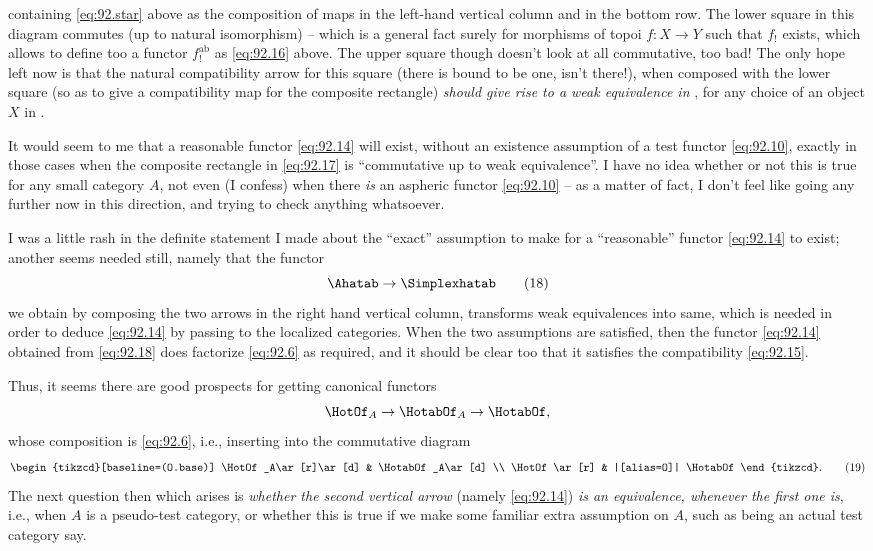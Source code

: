 containing \eqref{eq:92.star} above as the composition of maps in the
left-hand vertical column and in the bottom row. The lower square in
this diagram commutes (up to natural isomorphism) -- which is a
general fact surely for morphisms of topoi $f:X\to Y$ such that $f_!$
exists, which allows to define too a functor $f_!^{\mathrm{ab}}$ as
\eqref{eq:92.16} above. The upper square though doesn't look at all
commutative, too bad! The only hope left now is that the natural
compatibility arrow for this square (there is bound to be one, isn't
there!), when composed with the lower square (so as to give a
compatibility map for the composite rectangle) \emph{should give rise
  to a weak equivalence in} \Simplexhatab, for any choice of an object
$X$ in \Ahat.

It would seem to me that a reasonable functor \eqref{eq:92.14} will
exist, without an existence assumption of a test functor
\eqref{eq:92.10}, exactly in those cases when the composite rectangle
in \eqref{eq:92.17} is ``commutative up to weak equivalence''. I have
no idea whether or not this is true for any small category $A$, not
even (I confess) when there \emph{is} an aspheric functor
\eqref{eq:92.10} -- as a matter of fact, I don't feel like going any
further now in this direction, and trying to check anything
whatsoever.

I was a little rash in the definite statement I made about the
``exact'' assumption to make for a ``reasonable'' functor
\eqref{eq:92.14} to exist; another seems needed still, namely that the
functor
\begin{equation}
  \label{eq:92.18}
  \Ahatab\to\Simplexhatab\tag{18}
\end{equation}
we obtain by composing the two arrows in the right hand vertical
column, transforms weak equivalences into same, which is needed in
order to deduce \eqref{eq:92.14} by passing to the localized
categories. When the two assumptions are satisfied, then the functor
\eqref{eq:92.14} obtained from \eqref{eq:92.18} does factorize
\eqref{eq:92.6} as required, and it should be clear too that it
satisfies the compatibility \eqref{eq:92.15}.

Thus, it seems there are good prospects for getting canonical functors
\[\HotOf_A \to \HotabOf_A \to \HotabOf,\]
whose composition is \eqref{eq:92.6}, i.e., inserting into the
commutative diagram
\begin{equation}
  \label{eq:92.19}
  \begin{tabular}{@{}c@{}}
    \begin{tikzcd}[baseline=(O.base)]
      \HotOf_A\ar[r]\ar[d] & \HotabOf_A\ar[d] \\
      \HotOf \ar[r] & |[alias=O]| \HotabOf
    \end{tikzcd}.
  \end{tabular}
  \tag{19}
\end{equation}
The next question then which arises is \emph{whether the second
  vertical arrow} (namely \eqref{eq:92.14}) \emph{is an equivalence,
  whenever the first one is}, i.e., when $A$ is a pseudo-test
category, or whether this is true if we make some familiar extra
assumption on $A$, such as being an actual test category say.

